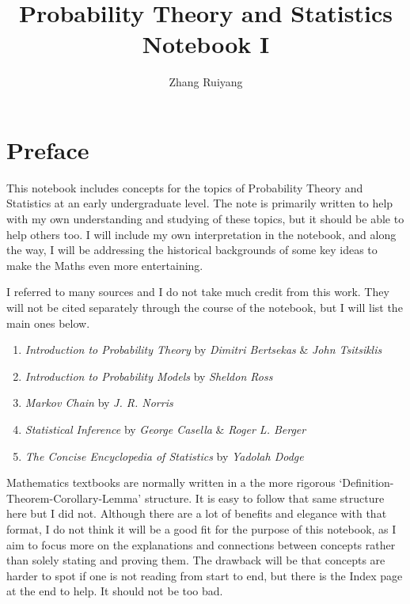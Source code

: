 \documentclass[11pt, a4paper, oneside]{book}
\theoremstyle{definition}
\begin{document}
\frontmatter 

\title{\huge Probability Theory and Statistics Notebook I}
\author{\Large{Zhang Ruiyang}}
\date{}
\maketitle

\tableofcontents

\newpage

\chapter*{Preface}

This notebook includes concepts for the topics of Probability Theory and Statistics at an early undergraduate level. The note is primarily written to help with my own understanding and studying of these topics, but it should be able to help others too. I will include my own interpretation in the notebook, and along the way, I will be addressing the historical backgrounds of some key ideas to make the Maths even more entertaining. 

\noindent I referred to many sources and I do not take much credit from this work. They will not be cited separately through the course of the notebook, but I will list the main ones below. 

\begin{enumerate}
\item \emph{Introduction to Probability Theory} by \emph{Dimitri Bertsekas} \& \emph{John Tsitsiklis}
\item \emph{Introduction to Probability Models} by \emph{Sheldon Ross}
\item \emph{Markov Chain} by \emph{J. R. Norris}
\item \emph{Statistical Inference} by \emph{George Casella} \& \emph{Roger L. Berger}
\item \emph{The Concise Encyclopedia of Statistics} by \emph{Yadolah Dodge}
\end{enumerate}

\noindent Mathematics textbooks are normally written in a the more rigorous `Definition-Theorem-Corollary-Lemma' structure. It is easy to follow that same structure here but I did not. Although there are a lot of benefits and elegance with that format, I do not think it will be a good fit for the purpose of this notebook, as I aim to focus more on the explanations and connections between concepts rather than solely stating and proving them. The drawback will be that concepts are harder to spot if one is not reading from start to end, but there is the Index page at the end to help. It should not be too bad. 
\end{document}

